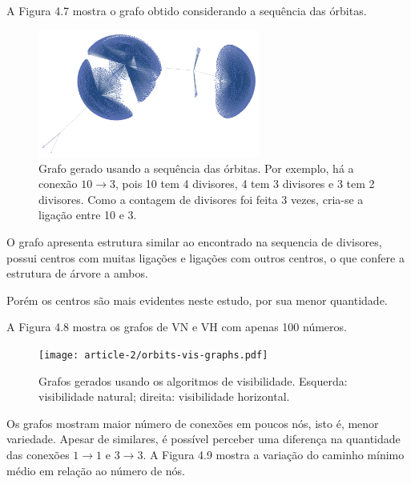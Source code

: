 \documentclass[12pt,a4paper,fleqn]{report}
\begin{document}
A Figura 4.7 mostra o grafo obtido considerando a sequência das órbitas.

\begin{figure}[H]
    \includegraphics[width=0.65\textwidth]{article-2/orbits.pdf}
    \centering
    \caption{Grafo gerado usando a sequência das órbitas. Por exemplo, há a conexão $10\to3$, pois 10 tem 4 divisores, 4 tem 3 divisores e 3 tem 2 divisores. Como
    a contagem de divisores foi feita 3 vezes, cria-se a ligação entre 10 e 3.}
    \label{frame}
\end{figure}

O grafo apresenta estrutura similar ao encontrado na sequencia de divisores, possui centros
com muitas ligações e ligações com outros centros, o que confere a estrutura de árvore a ambos.

Porém os centros são mais evidentes neste estudo, por sua menor quantidade.


A Figura 4.8 mostra os grafos de VN e VH com apenas 100 números.

\begin{figure}[H]
    \centering
    \texttt{[image: article-2/orbits-vis-graphs.pdf]}
    \caption{ Grafos gerados usando os algoritmos de visibilidade. Esquerda: visibilidade natural; 
    direita: visibilidade horizontal.}
    \label{graph-orbits-vis}
\end{figure}

Os grafos mostram maior número de conexões em poucos nós, isto é, menor variedade.
Apesar de similares, é possível perceber uma diferença na quantidade das
conexões $1\to 1$ e $3\to 3$. 
A Figura 4.9 mostra a variação do caminho mínimo médio em relação ao
número de nós.
\end{document}
